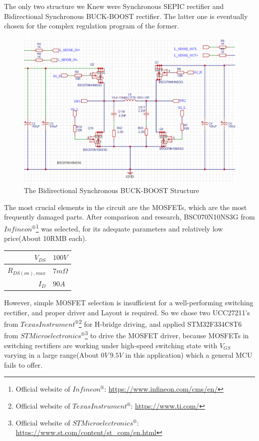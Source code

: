 \documentclass[a4paper,num-refs]{oup-contemporary}
\begin{document}
The only two structure we Knew were Synchronous SEPIC rectifier and Bidirectional Synchronous BUCK-BOOST rectifier. The latter one is eventually chosen for the complex regulation program of the former.

\begin{figure}[h]
	\centering
	\includegraphics[width=0.8\linewidth]{BuckBoost.png}
	\caption{The Bidirectional Synchronous BUCK-BOOST Structure}
\end{figure} 

The most crucial elements in the circuit are the MOSFETs, which are the most frequently damaged parts. After comparison and research, BSC070N10NS3G from $ Infineon^{\circledR} $\footnote{Official website of $ Infineon^{\circledR} $: \href{https://www.infineon.com/cms/en/}{https://www.infineon.com/cms/en/}} was selected, for its adequate parameters and relatively low price(About 10RMB each). 


\begin{table}[h]
	\begin{center}
		\begin{tabular}{r l}
			$ V_{DS} $ & $ 100V $ \\
			\hline
			$ R_{DS(on),max} $ & $ 7m\Omega $ \\
			\hline
			$ I_D $ & $ 90A $ \\
		\end{tabular}
	\end{center}
\end{table} 

However, simple MOSFET selection is insufficient for a well-performing switching rectifier, and proper driver and Layout is required. So we chose two UCC27211's from $ Texas Instrument^{\circledR} $\footnote{Official website of $ Texas Instrument^{\circledR} $: \href{https://www.ti.com/}{https://www.ti.com/}} for H-bridge driving, and applied STM32F334C8T6 from $ STMicroelectronics^{\circledR} $\footnote{Official website of $ STMicroelectronics^{\circledR} $: \href{https://www.st.com/content/st_com/en.html}{https://www.st.com/content/st\_com/en.html}} to drive the MOSFET driver, because MOSFETs in switching rectifiers are working under high-speed switching state with $ V_{GS} $ varying in a large range(About $ 0V~9.5V $ in this application) which a general MCU fails to offer. 
\end{document}
